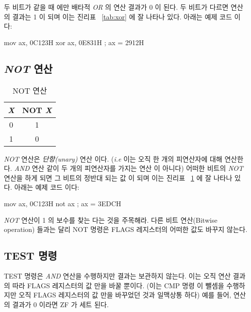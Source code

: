두 비트가 같을 때 에만 배타적 \emph{OR} 의 연산 결과가 0 이 된다. 두 비트가 
다르면 연산의 결과는 1 이 되며 이는 진리표 ~\ref{tab:xor} 에 잘 나타나 있다. 
아래는 예제 코드 이다:

\begin{AsmCodeListing}[frame=none]
      mov    ax, 0C123H
      xor    ax, 0E831H          ; ax = 2912H
\end{AsmCodeListing}

\subsection{\emph{NOT} 연산}

\begin{table}[t]
\centering
\begin{tabular}{|c|c|}
\hline
\emph{X} & NOT \emph{X} \\
\hline \hline
0 & 1 \\
1 & 0 \\
\hline
\end{tabular}
\caption{NOT 연산 \label{tab:not}}
\end{table}

\emph{NOT} 연산은 \emph{단항(unary)} 연산 이다. (\emph{i.e} 이는 오직 한 개의
피연산자에 대해 연산한다. \emph{AND} 연산 같이 두 개의 피연산자를 가지는 연산
이 아니다) 어떠한 비트의 \emph{NOT} 연산을 하게 되면 그 비트의 정반대 되는 값
이 되며 이는 진리표 ~\ref{tab:not} 에 잘 나타나 있다. 아래는 예제 코드 이다:

\begin{AsmCodeListing}[frame=none]
      mov    ax, 0C123H
      not    ax                 ; ax = 3EDCH
\end{AsmCodeListing}

\emph{NOT} 연산이 1 의 보수를 찾는 다는 것을 주목해라. 다른 비트 연산(Bitwise operation)
들과는 달리 {\code NOT} 명령은 {\code FLAGS} 레지스터의 어떠한 값도 바꾸지 않는다. 

\subsection{{\protect\code TEST} 명령}

{\code TEST} 명령은 \emph{AND} 연산을 수행하지만 결과는 보관하지 않는다. 이는 오직 
연산 결과의 따라 {\code FLAGS} 레지스터의 값 만을 바꿀 뿐이다. (이는 {\code CMP} 명령
이 뺄셈을 수행하지만 오직 {\code FLAGS} 레지스터의 값 만을 바꾸었던 것과 일맥상통 하다) 
예를 들어, 연산의 결과가 0 이라면 {\code ZF} 가 세트 된다. 

